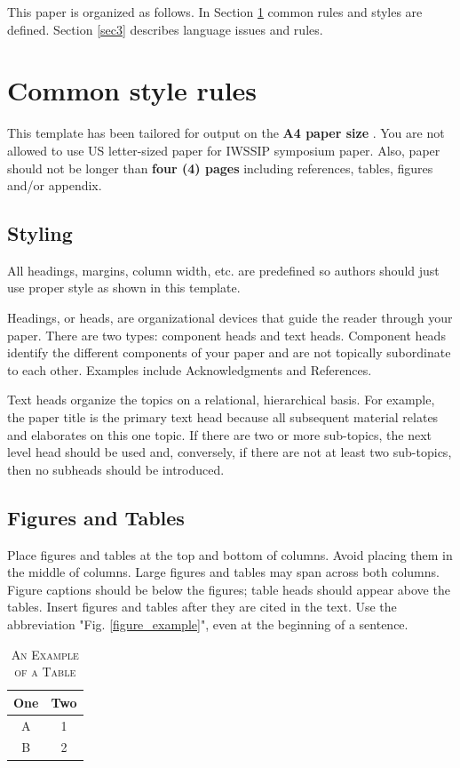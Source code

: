 \documentclass[a4paper,conference]{IEEEtran}
\begin{document}
This paper is organized as follows. In Section \ref{sec2} common rules and styles are defined. Section \ref{sec3} describes language issues and rules.

\section{Common style rules}
\label{sec2}
This template has been tailored for output on the \textbf{A4 paper size}%
. You are not allowed to use US letter-sized paper for IWSSIP symposium paper.
Also, paper should not be longer than \textbf{four (4) pages} including references, tables, figures and/or appendix.

\subsection{Styling}
\label{subsec1}
All headings, margins, column width, etc. are predefined so authors should just use proper style as shown in this template.

Headings, or heads, are organizational devices that guide the reader through your paper. There are two types: component heads and text heads.
Component heads identify the different components of your paper and are not topically subordinate to each other. Examples include Acknowledgments and References. 

Text heads organize the topics on a relational, hierarchical basis. For example, the paper title is the primary text head because all subsequent material relates and elaborates on this one topic. If there are two or more sub-topics, the next level head should be used and, conversely, if there are not at least two sub-topics, then no subheads should be introduced. 

\subsection{Figures and Tables}
\label{subsec}
Place figures and tables at the top and bottom of columns. Avoid placing them in the middle of columns. Large figures and tables may span across both columns. Figure captions should be below the figures; table heads should appear above the tables. Insert figures and tables after they are cited in the text. Use the abbreviation "Fig. \ref{figure_example}", even at the beginning of a sentence.

\begin{table}[!b]
\renewcommand{\arraystretch}{1.3}
\caption{\textsc{An Example of a Table}}
\label{table_example}
\centering
\begin{tabular}{|c||c|}
\hline
\textbf{One} & \textbf{Two}\\
\hline
A & 1\\
\hline
B & 2\\
\hline
\end{tabular}
\end{table}
\end{document}
